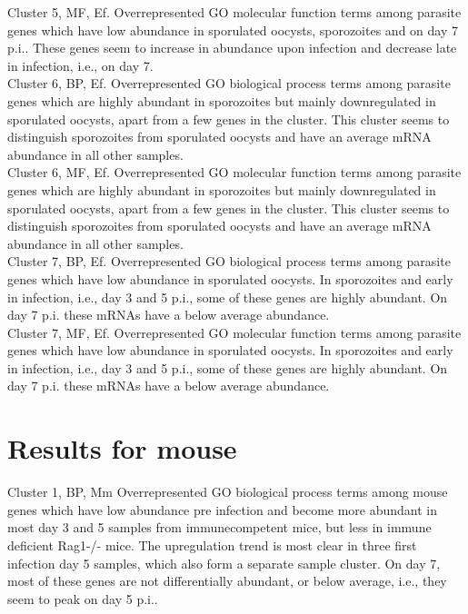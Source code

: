 \documentclass{article}
\begin{document}
  Cluster 5, MF, Ef.
  Overrepresented GO molecular function terms among parasite genes which have low abundance
  in sporulated oocysts, sporozoites and on day 7 p.i.. These genes seem to increase in abundance
  upon infection and decrease late in infection, i.e., on day 7.\\
  
  
  Cluster 6, BP, Ef.
  Overrepresented GO biological process terms among parasite genes which are highly abundant in sporozoites
  but mainly downregulated in sporulated oocysts, apart from a few genes in the cluster.
  This cluster seems to distinguish sporozoites from sporulated oocysts and have an average mRNA abundance in
  all other samples.\\
  
  
  Cluster 6, MF, Ef.
  Overrepresented GO molecular function terms among parasite genes which are highly abundant in sporozoites
  but mainly downregulated in sporulated oocysts, apart from a few genes in the cluster.
  This cluster seems to distinguish sporozoites from sporulated oocysts and have an average mRNA abundance in
  all other samples.\\
  
  
  Cluster 7, BP, Ef.
  Overrepresented GO biological process terms among parasite genes which have low abundance in sporulated oocysts.
  In sporozoites and early in infection, i.e., day 3 and 5 p.i., some of these genes are highly abundant. On day
  7 p.i. these mRNAs have a below average abundance.\\
  
  
  Cluster 7, MF, Ef.
  Overrepresented GO molecular function terms among parasite genes which have low abundance in sporulated oocysts.
  In sporozoites and early in infection, i.e., day 3 and 5 p.i., some of these genes are highly abundant. On day
  7 p.i. these mRNAs have a below average abundance.\\
  

\newpage

\section{Results for mouse}
  Cluster 1, BP, Mm
  Overrepresented GO biological process terms among mouse genes which have low abundance pre infection and 
  become more abundant in most day 3 and 5 samples from immunecompetent mice, but less in immune deficient Rag1-/- mice. 
  The upregulation trend is most clear in three first infection day 5 samples, which also form a separate
  sample cluster. On day 7, most of these genes are not differentially abundant, or below average, i.e., they
  seem to peak on day 5 p.i..\\
  
\end{document}
